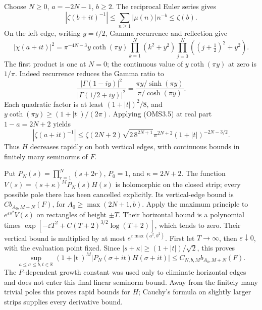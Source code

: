 Choose \(N\ge0\), \(a=-2N-1\), \(b\ge2\). The reciprocal Euler series
gives \[
|\zeta(b+it)^{-1}|\le\sum_{n\ge1}|\mu(n)|n^{-b}\le\zeta(b).
\tag{OMS3.5}
\] On the left edge, writing \(y=t/2\), Gamma recurrence and reflection
give \[
|\chi(a+it)|^2=
\pi^{-4N-3}y\coth(\pi y)
\prod_{k=1}^{N}(k^2+y^2)
\prod_{j=0}^{N}((j+\tfrac12)^2+y^2).
\tag{OMS3.6}
\] The first product is one at \(N=0\); the continuous value of
\(y\coth(\pi y)\) at zero is \(1/\pi\). Indeed recurrence reduces the
Gamma ratio to \[
\frac{|\Gamma(1-iy)|^2}{|\Gamma(1/2+iy)|^2}
=\frac{\pi y/\sinh(\pi y)}{\pi/\cosh(\pi y)}.
\] Each quadratic factor is at least \((1+|t|)^2/8\), and
\(y\coth(\pi y)\ge(1+|t|)/(2\pi)\). Applying (OMS3.5) at real part
\(1-a=2N+2\) yields \[
|\zeta(a+it)^{-1}|\le
\zeta(2N+2)\sqrt{2\,8^{2N+1}}\pi^{2N+2}
(1+|t|)^{-2N-3/2}.
\tag{OMS3.7}
\] Thus \(H\) decreases rapidly on both vertical edges, with continuous
bounds in finitely many seminorms of \(F\).

Put \(P_N(s)=\prod_{r=1}^N(s+2r)\), \(P_0=1\), and \(\kappa=2N+2\). The
function \(V(s)=(s+\kappa)^M P_N(s)H(s)\) is holomorphic on the closed
strip; every possible pole there has been cancelled explicitly. Its
vertical-edge bound is \(C b_{A_0,M+N}(F)\), for \(A_0\ge\max(2N+1,b)\).
Apply the maximum principle to \(e^{\varepsilon s^2}V(s)\) on rectangles
of height \(\pm T\). Their horizontal bound is a polynomial times
\(\exp[-\varepsilon T^2+C(T+2)^{3/2}\log(T+2)]\), which tends to zero.
Their vertical bound is multiplied by at most
\(e^{\varepsilon\max(a^2,b^2)}\). First let \(T\to\infty\), then
\(\varepsilon\downarrow0\), with the evaluation point fixed. Since
\(|s+\kappa|\ge(1+|t|)/\sqrt2\), this proves \[
\sup_{a\le\sigma\le b,t\in\mathbb R}
(1+|t|)^M|P_N(\sigma+it)H(\sigma+it)|
\le C_{N,b,M}b_{A_0,M+N}(F).
\tag{OMS3.8}
\] The \(F\)-dependent growth constant was used only to eliminate
horizontal edges and does not enter this final linear seminorm bound.
Away from the finitely many trivial poles this proves rapid bounds for
\(H\); Cauchy's formula on slightly larger strips supplies every
derivative bound.


